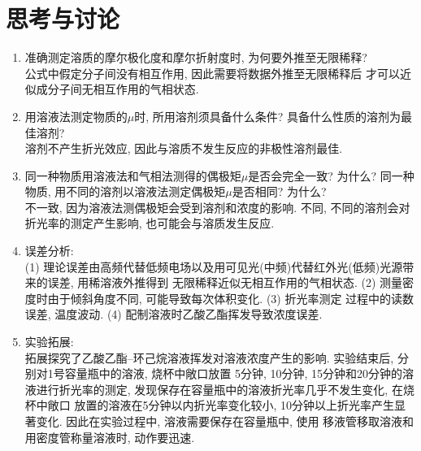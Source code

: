 \documentclass[a4paper]{article}
\begin{document}
\section{思考与讨论}
\begin{enumerate}
	\item 准确测定溶质的摩尔极化度和摩尔折射度时, 为何要外推至无限稀释?\\
	公式中假定分子间没有相互作用, 因此需要将数据外推至无限稀释后
	才可以近似成分子间无相互作用的气相状态.
	\item 用溶液法测定物质的$\mu$时, 所用溶剂须具备什么条件? 
	具备什么性质的溶剂为最佳溶剂?\\
	溶剂不产生折光效应, 因此与溶质不发生反应的非极性溶剂最佳.
	\item 同一种物质用溶液法和气相法测得的偶极矩$\mu$是否会完全一致?
	为什么? 同一种物质, 用不同的溶剂以溶液法测定偶极矩$\mu$是否相同? 为什么?\\
	不一致, 因为溶液法测偶极矩会受到溶剂和浓度的影响. 不同, 不同的溶剂会对
	折光率的测定产生影响, 也可能会与溶质发生反应.
	\item 误差分析:\\
	(1) 理论误差由高频代替低频电场以及用可见光(中频)代替红外光(低频)光源带来的误差, 用稀溶液外推得到
	无限稀释近似无相互作用的气相状态. (2) 测量密度时由于倾斜角度不同, 可能导致每次体积变化. (3) 折光率测定
	过程中的读数误差, 温度波动. (4) 配制溶液时乙酸乙酯挥发导致浓度误差.
	\item 实验拓展: \\
	拓展探究了乙酸乙酯--环己烷溶液挥发对溶液浓度产生的影响. 实验结束后, 分别对1号容量瓶中的溶液, 烧杯中敞口放置
	5分钟, 10分钟, 15分钟和20分钟的溶液进行折光率的测定, 发现保存在容量瓶中的溶液折光率几乎不发生变化, 在烧杯中敞口
	放置的溶液在5分钟以内折光率变化较小, 10分钟以上折光率产生显著变化. 因此在实验过程中, 溶液需要保存在容量瓶中, 使用
	移液管移取溶液和用密度管称量溶液时, 动作要迅速.
\end{enumerate}
\newpage
\end{document}
